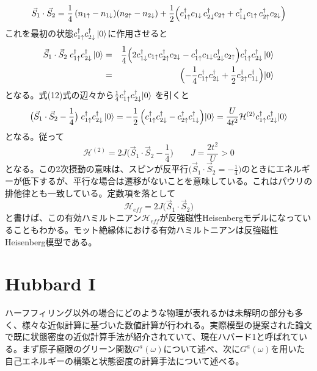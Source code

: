\documentclass[12pt]{jarticle}
\begin{document}
\begin{equation}
  \vec S_1 \cdot \vec S_2
= \frac14\,(n_{1\uparrow}-n_{1\downarrow})(n_{2\uparrow}-n_{2\downarrow})
+ \frac12\Bigl(
  c_{1\uparrow}^\dagger c_{1\downarrow}\,c_{2\downarrow}^\dagger c_{2\uparrow}
+ c_{1\downarrow}^\dagger c_{1\uparrow}\,c_{2\uparrow}^\dagger c_{2\downarrow}
\Bigr)
\end{equation}
これを最初の状態$c_{1\uparrow}^\dagger c_{2\downarrow}^\dagger\ket{0}$に作用させると
\begin{eqnarray}
  \vec S_1\cdot\vec S_2 \;c_{1\uparrow}^\dagger c_{2\downarrow}^\dagger\ket{0}
&=& \frac{1}{4}\Bigl(2c_{1\downarrow}^\dagger c_{1\uparrow}c_{2\uparrow}^\dagger c_{2\downarrow} - c_{1\uparrow}^\dagger c_{1\downarrow}c_{2\downarrow}^\dagger c_{2\uparrow}\Bigr)c_{1\uparrow}^\dagger c_{2\downarrow}^\dagger\ket{0} \notag\\
&=&\Bigl(-\frac{1}{4}c_{1\uparrow}^\dagger c_{2\downarrow}^\dagger+\frac{1}{2}c_{2\uparrow}^\dagger c_{1\downarrow}^\dagger\Bigr)\!\ket{0}
\end{eqnarray}
となる。式(12)式の辺々から$\frac{1}{4}c_{1\uparrow}^\dagger c_{2\downarrow}^\dagger\!\ket{0}$
を引くと
\begin{equation}
  \bigl(\vec S_1\cdot\vec S_2 - \frac{1}{4}\bigr) \;c_{1\uparrow}^\dagger c_{2\downarrow}^\dagger\ket{0} = -\frac{1}{2}\,
\Bigl(c_{1\uparrow}^\dagger c_{2\downarrow}^\dagger-c_{2\uparrow}^\dagger c_{1\downarrow}^\dagger\Bigr)\!\ket{0} = \frac{U}{4t^2}\mathcal{H}^{(2)}
c_{1\uparrow}^\dagger c_{2\downarrow}^\dagger\!\ket{0}
\end{equation}
となる。従って
\begin{equation}
  \mathcal{H}^{(2)} = 2J\bigl(\vec S_1\cdot\vec S_2 - \frac{1}{4}\bigr) \qquad J = \frac{2t^2}{U}>0
\end{equation}
となる。この2次摂動の意味は、スピンが反平行$\bigl(\vec S_1\cdot\vec S_2 = -\frac{1}{4}\bigr)$のときにエネルギーが低下するが、平行な場合は遷移がないことを意味している。これはパウリの排他律とも一致している。定数項を落として
\begin{equation}
  \mathcal{H}_{eff} = 2J\bigl(\vec S_1\cdot\vec S_2 \bigr)
\end{equation}
と書けば、この有効ハミルトニアン$\mathcal{H}_{eff}$が反強磁性Heisenbergモデルになっていることもわかる。モット絶縁体における有効ハミルトニアンは反強磁性Heisenberg模型である。

\section{Hubbard \rm{I}}
ハーフフィリング以外の場合にどのような物理が表れるかは未解明の部分も多く、様々な近似計算に基づいた数値計算が行われる。実際模型の提案された論文で既に状態密度の近似計算手法が紹介されていて、現在ハバード1と呼ばれている。まず原子極限のグリーン関数$G^a(\omega)$について述べ、次に$G^a(\omega)$を用いた自己エネルギーの構築と状態密度の計算手法について述べる。
\end{document}
